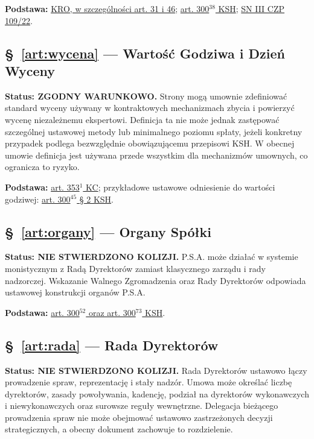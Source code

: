 \documentclass[12pt,a4paper]{report}
\begin{document}
\textbf{Podstawa:} \href{https://eli.gov.pl/eli/DU/2026/236/ogl}{KRO, w szczególności art. 31 i 46}; \href{https://eli.gov.pl/api/acts/DU/2024/18/text.html}{art. 300$^{38}$ KSH}; \href{https://www.sn.pl/sprawy/SitePages/Zagadnienia_prawne_SN.aspx?ItemSID=1718-301f4741-66aa-4980-b9fa-873e90506a11&ListName=Zagadnienia_prawne&Rok=2022}{SN III CZP 109/22}.

\subsection*{§~\ref{art:wycena} — Wartość Godziwa i Dzień Wyceny}
\textbf{Status: ZGODNY WARUNKOWO.} Strony mogą umownie zdefiniować standard wyceny używany w kontraktowych mechanizmach zbycia i powierzyć wycenę niezależnemu ekspertowi. Definicja ta nie może jednak zastępować szczególnej ustawowej metody lub minimalnego poziomu spłaty, jeżeli konkretny przypadek podlega bezwzględnie obowiązującemu przepisowi KSH. W obecnej umowie definicja jest używana przede wszystkim dla mechanizmów umownych, co ogranicza to ryzyko.

\textbf{Podstawa:} \href{https://eli.gov.pl/eli/DU/2026/795/ogl}{art. 353$^{1}$ KC}; przykładowe ustawowe odniesienie do wartości godziwej: \href{https://eli.gov.pl/api/acts/DU/2024/18/text.html}{art. 300$^{45}$ § 2 KSH}.

\subsection*{§~\ref{art:organy} — Organy Spółki}
\textbf{Status: NIE STWIERDZONO KOLIZJI.} P.S.A. może działać w systemie monistycznym z Radą Dyrektorów zamiast klasycznego zarządu i rady nadzorczej. Wskazanie Walnego Zgromadzenia oraz Rady Dyrektorów odpowiada ustawowej konstrukcji organów P.S.A.

\textbf{Podstawa:} \href{https://eli.gov.pl/api/acts/DU/2024/18/text.html}{art. 300$^{52}$ oraz art. 300$^{73}$ KSH}.

\subsection*{§~\ref{art:rada} — Rada Dyrektorów}
\textbf{Status: NIE STWIERDZONO KOLIZJI.} Rada Dyrektorów ustawowo łączy prowadzenie spraw, reprezentację i stały nadzór. Umowa może określać liczbę dyrektorów, zasady powoływania, kadencję, podział na dyrektorów wykonawczych i niewykonawczych oraz surowsze reguły wewnętrzne. Delegacja bieżącego prowadzenia spraw nie może obejmować ustawowo zastrzeżonych decyzji strategicznych, a obecny dokument zachowuje to rozdzielenie.
\end{document}
